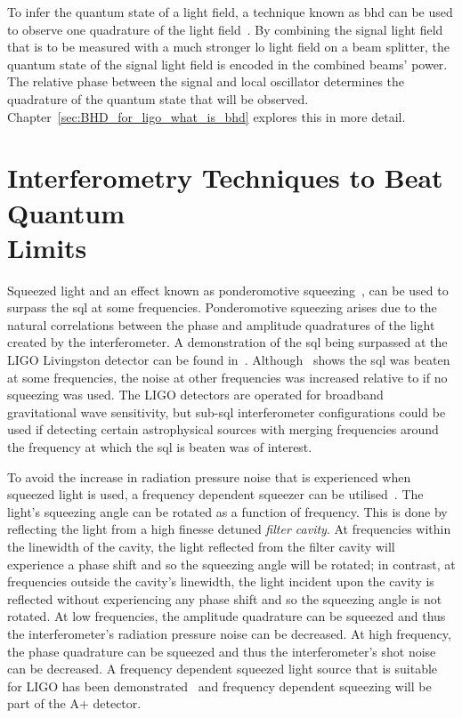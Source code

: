 \par
To infer the quantum state of a light field, a technique known as \gls{bhd} can be used to observe one quadrature of the light field~\cite{Walls1983}. By combining the signal light field that is to be measured with a much stronger \gls{lo} light field on a beam splitter, the quantum state of the signal light field is encoded in the combined beams' power. The relative phase between the signal and local oscillator determines the quadrature of the quantum state that will be observed. Chapter~\ref{sec:BHD_for_ligo_what_is_bhd} explores this in more detail. 
\section{Interferometry Techniques to Beat Quantum \\Limits}
\label{sec:detector_chapter_beating_IFO_quantum_limit}
Squeezed light and an effect known as ponderomotive squeezing~\cite{Kimble2001}, can be used to surpass the \gls{sql} at some frequencies. Ponderomotive squeezing arises due to the natural correlations between the phase and amplitude quadratures of the light created by the interferometer. A demonstration of the \gls{sql} being surpassed at the LIGO Livingston detector can be found in~\cite{Yu2020}. Although~\cite{Yu2020} shows the \gls{sql} was beaten at some frequencies, the noise at other frequencies was increased relative to if no squeezing was used. The LIGO detectors are operated for broadband gravitational wave sensitivity, but sub-\gls{sql} interferometer configurations could be used if detecting certain astrophysical sources with merging frequencies around the frequency at which the \gls{sql} is beaten was of interest. 
\par
To avoid the increase in radiation pressure noise that is experienced when squeezed light is used, a frequency dependent squeezer can be utilised~\cite{Kimble2001}. The light's squeezing angle can be rotated as a function of frequency. This is done by reflecting the light from a high finesse detuned \emph{filter cavity}. At frequencies within the linewidth of the cavity, the light reflected from the filter cavity will experience a phase shift and so the squeezing angle will be rotated; in contrast, at frequencies outside the cavity's linewidth, the light incident upon the cavity is reflected without experiencing any phase shift and so the squeezing angle is not rotated. At low frequencies, the amplitude quadrature can be squeezed and thus the interferometer's radiation pressure noise can be decreased. At high frequency, the phase quadrature can be squeezed and thus the interferometer's shot noise can be decreased. A frequency dependent squeezed light source that is suitable for LIGO has been demonstrated~\cite{Komori2020} and frequency dependent squeezing will be part of the A+ detector. 
